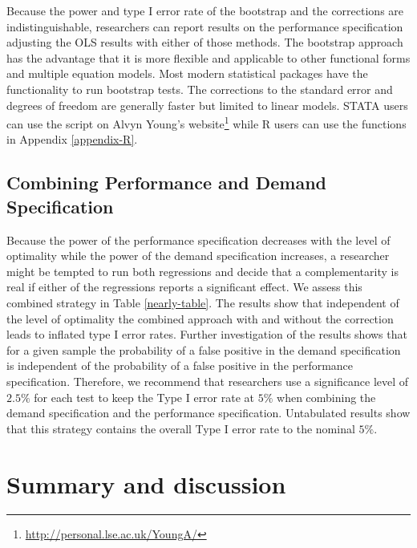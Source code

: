 \documentclass[12pt]{article}
\begin{document}


Because the power and type I error rate of the bootstrap and the \citet{young_improved_2016} corrections are indistinguishable, researchers can report results on the performance specification adjusting the OLS results with either of those methods. The bootstrap approach has the advantage that it is more flexible and applicable to other functional forms and multiple equation models. Most modern statistical packages have the functionality to run bootstrap tests. The corrections to the standard error and degrees of freedom are generally faster but limited to linear models. STATA users can use the script on Alvyn Young's website\footnote{\url{http://personal.lse.ac.uk/YoungA/}} while R users can use the functions in Appendix \ref{appendix-R}.

\subsection{Combining Performance and Demand Specification}

Because the power of the performance specification decreases with the level of optimality while the power of the demand specification increases, a researcher might be tempted to run both regressions and decide that a complementarity is real if either of the regressions reports a significant effect. We assess this combined strategy in Table \ref{nearly-table}. The results show that independent of the level of optimality the combined approach with and without the correction leads to inflated type I error rates. Further investigation of the results shows that for a given sample the probability of a false positive in the demand specification is independent of the probability of a false positive in the performance specification.  Therefore, we recommend that researchers use a significance level of $2.5\%$ for each test to keep the Type I error rate at $5\%$ when combining the demand specification and the performance specification. Untabulated results show that this strategy contains the overall Type I error rate to the nominal $5\%$.

\section{Summary and discussion}\label{summary-and-discussion}
\end{document}

